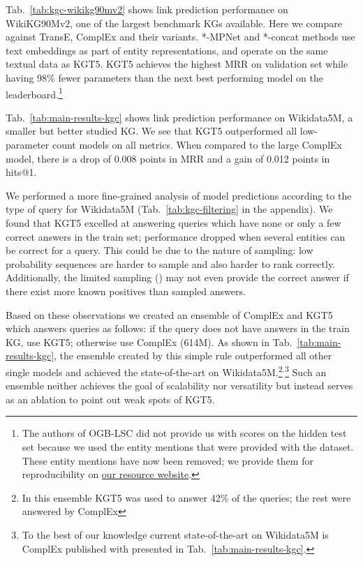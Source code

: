 \documentclass[11pt]{article}
\renewcommand\:{\colon} \newcommand{\sset}[1]{\left\{\,#1\,\right\}} \newcommand{\ssets}[1]{\left\{#1\right\}} \newcommand{\ssetn}[1]{\{\,#1\,\}}
\newcommand{\method}{\textsc{KGT5}}
\begin{document}
Tab.~\ref{tab:kgc-wikikg90mv2} shows link prediction performance on WikiKG90Mv2, one of the largest benchmark KGs available. Here we compare against TransE, ComplEx and their variants. *-MPNet and *-concat methods use text embeddings as part of entity representations, and operate on the same textual data as \method{}. \method{} achieves the highest MRR on validation set while having 98\% fewer parameters than the next best performing model on the leaderboard.\footnote{\label{ogb-lsc-note}The authors of OGB-LSC did not provide us with scores on the hidden test set because we used the entity mentions that were provided with the dataset. These entity mentions have now been removed; we provide them for reproducibility on \href{ https://github.com/apoorvumang/kgt5}{our resource website}.}

Tab.~\ref{tab:main-results-kgc} shows link prediction performance on Wikidata5M, a smaller but better studied KG. 
We see that \method{} outperformed all low-parameter count models on all metrics. When compared to the large ComplEx model, there is a drop of 0.008 points in MRR and a gain of 0.012 points in hits@1.

We performed a more fine-grained analysis of model predictions according to the type of query for Wikidata5M (Tab.~\ref{tab:kgc-filtering} in the appendix). 
We found that \method{} excelled at answering queries which have none or only a few correct answers in the train set; performance dropped when several entities can be correct for a query. 
This could be due to the nature of sampling: low probability sequences are harder to sample and also harder to rank correctly.
Additionally, the limited sampling () may not even provide the correct answer if there exist more known positives than sampled answers.


Based on these observations we created an ensemble of ComplEx and \method{} which answers queries as follows:
if the query does not have answers in the train KG, use \method{};
otherwise use ComplEx (614M).
As shown in Tab.~\ref{tab:main-results-kgc}, the ensemble created by this simple rule outperformed all other single models and achieved the state-of-the-art on Wikidata5M.\footnote{
    In this ensemble \method{} was used to answer 42\% of the queries; the rest were answered by ComplEx
    }$^,$\footnote{
    To the best of our knowledge current state-of-the-art on Wikidata5M is ComplEx published with \citet{kochsiek2021parallel} presented in Tab.~\ref{tab:main-results-kgc}.
}
Such an ensemble neither achieves the goal of scalability nor versatility but instead serves as an ablation to point out weak spots of \method{}.
\end{document}
